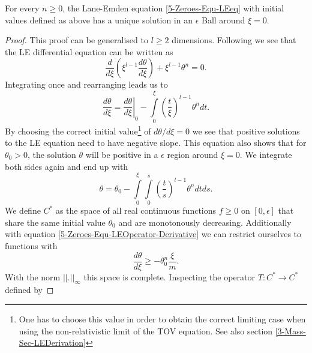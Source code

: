 \begin{lemma}
	\label{5-Zeroes-Lem-Lane-EmdenFiniteBoundary1}
	For every $n\geq0$, the Lane-Emden equation \ref{5-Zeroes-Equ-LEeq} with initial values defined as above has a unique solution in an $\epsilon$ Ball around $\xi=0$.
\end{lemma}
\begin{proof}
	This proof can be generalised to $l\geq2$ dimensions. 
	Following \cite{quittnerSuperlinearParabolicProblems2007a} we see that the LE differential equation can be written as
	\begin{equation}
		\frac{d}{d\xi}\left(\xi^{l-1}\frac{d\theta}{d\xi}\right) + \xi^{l-1}\theta^n = 0.
	\end{equation}
	Integrating once and rearranging leads us to
	\begin{equation}
		\frac{d\theta}{d\xi} = \left.\frac{d\theta}{d\xi}\right|_0 - \int\limits_0^\xi\left(\frac{t}{\xi}\right)^{l-1}\theta^ndt.
		\label{5-Zeroes-Equ-LEOperator-Derivative}
	\end{equation}
	By choosing the correct initial value\footnote{One has to choose this value in order to obtain the correct limiting case when using the non-relativistic limit of the \ac{TOV} equation. See also section \ref{3-Mass-Sec-LEDerivation}} of $d\theta/d\xi=0$ we see that positive solutions to the LE equation need to have negative slope.
	This equation also shows that for $\theta_0>0$, the solution $\theta$ will be positive in a $\epsilon$ region around $\xi=0$.
	We integrate both sides again and end up with
	\begin{equation}
		\theta = \theta_0 - \int\limits_0^\xi\int\limits_0^s\left(\frac{t}{s}\right)^{l-1}\theta^ndtds.
		\label{5-Zeroes-Equ-LEOperator}
	\end{equation}
	We define $C^*$ as the space of all real continuous functions $f\geq0$ on $[0,\epsilon]$ that share the same initial value $\theta_0$ and are monotonously decreasing.
	Additionally with equation \eqref{5-Zeroes-Equ-LEOperator-Derivative} we can restrict ourselves to functions with
	\begin{equation}
		\frac{d\theta}{d\xi} \geq -\theta_0^n\frac{\xi}{m}.
		\label{5-Zeroes-Equ-LEOperator-Restrict-Slope}
	\end{equation}
	With the norm $||.||_\infty$ this space is complete.
	Inspecting the operator $T:C^*\rightarrow C^*$ defined by

\end{proof}
